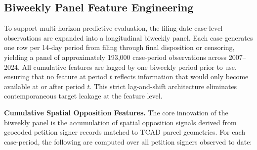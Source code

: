 \documentclass[twoside,11pt]{article}
\begin{document}
\begin{table}[!htbp]
\centering
\caption{Illustrative Cross-Section of the DML Panel}
\label{tab:panel_illustration}
\end{table}

\subsection{Biweekly Panel Feature Engineering}
\label{sec:biweekly_features}

To support multi-horizon predictive evaluation, the filing-date case-level observations are expanded into a longitudinal biweekly panel. Each case generates one row per 14-day period from filing through final disposition or censoring, yielding a panel of approximately 193,000 case-period observations across 2007--2024. All cumulative features are lagged by one biweekly period prior to use, ensuring that no feature at period $t$ reflects information that would only become available at or after period $t$. This strict lag-and-shift architecture eliminates contemporaneous target leakage at the feature level.

\textbf{Cumulative Spatial Opposition Features.} The core innovation of the biweekly panel is the accumulation of spatial opposition signals derived from geocoded petition signer records matched to TCAD parcel geometries. For each case-period, the following are computed over all petition signers observed to date:
\end{document}
